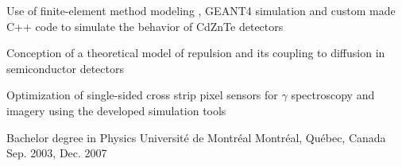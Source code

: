 \begin{cventries}
{\begin{cvitems}
\item Use of finite-element method modeling , GEANT4 simulation and custom made C++ code to simulate the behavior of CdZnTe detectors
\item Conception of a theoretical model of repulsion and its coupling to diffusion in semiconductor detectors
\item Optimization of single-sided cross strip pixel sensors for $\gamma$ spectroscopy and imagery using the  developed simulation tools 
\\
      \end{cvitems}
      }
  \cventry
    {Bachelor degree in Physics} %
    {Universit\'e de Montr\'eal} %
    {Montr\'eal, Qu\'ebec, Canada} %
    {Sep. 2003, Dec. 2007} %
    {
    }
\end{cventries}
